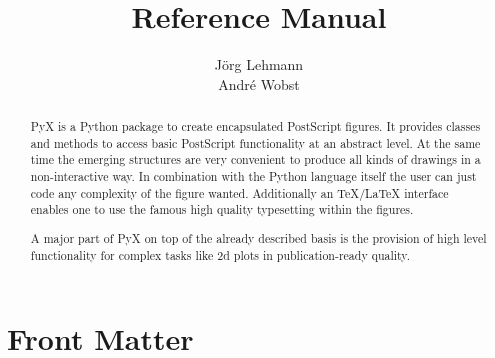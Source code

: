 \documentclass{manual}
\title{\PyX{} Reference Manual}
\author{J\"org Lehmann\\
Andr\'e Wobst}
\date{}
\def\PyX{PyX} %
\begin{document}
\maketitle

\ifhtml %
\chapter*{Front Matter\label{front}}
\fi
\begin{abstract}
\noindent
\PyX{} is a Python package to create encapsulated PostScript figures. It
provides classes and methods to access basic PostScript functionality
at an abstract level. At the same time the emerging structures are
very convenient to produce all kinds of drawings in a non-interactive
way. In combination with the Python language itself the user can just
code any complexity of the figure wanted. Additionally an
\TeX{}/\LaTeX{} interface enables one to use the famous high quality
typesetting within the figures.

A major part of \PyX{} on top of the already described basis is the
provision of high level functionality for complex tasks like 2d plots
in publication-ready quality.
\end{abstract}

\tableofcontents
















\appendix







\end{document}
